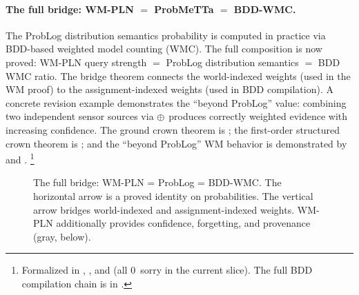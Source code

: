 \documentclass[11pt,openany]{report}
\begin{document}
\paragraph{The full bridge: WM-PLN $=$ ProbMeTTa $=$ BDD-WMC.}
The ProbLog distribution semantics probability is computed in
practice via BDD-based weighted model counting (WMC).  The full
composition is now proved: WM-PLN query strength $=$ ProbLog
distribution semantics $=$ BDD WMC ratio.  The bridge theorem
 connects the world-indexed
weights (used in the WM proof) to the assignment-indexed weights
(used in BDD compilation).  A concrete revision example
demonstrates the ``beyond ProbLog'' value: combining two
independent sensor sources via $\oplus$ produces correctly
weighted evidence with increasing confidence.  The ground crown theorem is
; the first-order structured crown
theorem is ; and the
``beyond ProbLog'' WM behavior is demonstrated by
 and .%
\footnote{Formalized in
,
, and
(all 0~sorry in the current slice).  The full BDD compilation chain
is in .}

\begin{figure}[htbp]
\centering
{}
\caption{The full bridge: WM-PLN = ProbLog = BDD-WMC.
  The horizontal arrow is a proved identity on probabilities.
  The vertical arrow bridges world-indexed and assignment-indexed
  weights.  WM-PLN additionally provides confidence, forgetting,
  and provenance (gray, below).}
\label{fig:problog-bridge}
\end{figure}
\end{document}
